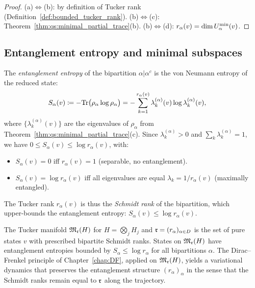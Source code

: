 \begin{proof}
(a)$\Leftrightarrow$(b): by definition of Tucker rank
(Definition~\ref{def:bounded_tucker_rank}).
(b)$\Leftrightarrow$(c): Theorem~\ref{thm:qs:minimal_partial_trace}(b).
(b)$\Leftrightarrow$(d): $r_\alpha(v) = \dim U^{\min}_{\alpha}(v)$.
\end{proof}

\subsection*{Entanglement entropy and minimal subspaces}

The \emph{entanglement entropy} of the bipartition $\alpha|\alpha^c$
is the von Neumann entropy of the reduced state:
\begin{equation}
\label{eq:qs:entanglement_entropy}
    S_\alpha(v) \coloneqq -\mathrm{Tr}\bigl(\rho_\alpha \log \rho_\alpha\bigr)
    = -\sum_{k=1}^{r_\alpha(v)} \lambda_k^{(\alpha)}(v)
    \log \lambda_k^{(\alpha)}(v),
\end{equation}
where $\{\lambda_k^{(\alpha)}(v)\}$ are the eigenvalues of $\rho_\alpha$
from Theorem~\ref{thm:qs:minimal_partial_trace}(c). Since
$\lambda_k^{(\alpha)} > 0$ and $\sum_k \lambda_k^{(\alpha)} = 1$,
we have $0 \leq S_\alpha(v) \leq \log r_\alpha(v)$, with:
\begin{itemize}
\item $S_\alpha(v) = 0$ iff $r_\alpha(v) = 1$ (separable, no entanglement).
\item $S_\alpha(v) = \log r_\alpha(v)$ iff all eigenvalues are equal
    $\lambda_k = 1/r_\alpha(v)$ (maximally entangled).
\end{itemize}
The Tucker rank $r_\alpha(v)$ is thus the \emph{Schmidt rank} of the
bipartition, which upper-bounds the entanglement entropy:
$S_\alpha(v) \leq \log r_\alpha(v)$.

\begin{remark}
\label{rem:qs:tucker_entanglement}
The Tucker manifold $\mathfrak{M}_{\mathfrak{r}}(H)$ for $H = \bigotimes_j H_j$
and $\mathfrak{r} = (r_\alpha)_{\alpha \in D}$ is the set of pure states $v$
with prescribed bipartite Schmidt ranks. States on $\mathfrak{M}_{\mathfrak{r}}(H)$
have entanglement entropies bounded by $S_\alpha \leq \log r_\alpha$
for all bipartitions $\alpha$. The Dirac--Frenkel principle of
Chapter~\ref{chap:DF}, applied on $\mathfrak{M}_{\mathfrak{r}}(H)$, yields a
variational dynamics that preserves the entanglement structure
$(r_\alpha)_\alpha$ in the sense that the Schmidt ranks remain
equal to $\mathfrak{r}$ along the trajectory.
\end{remark}


